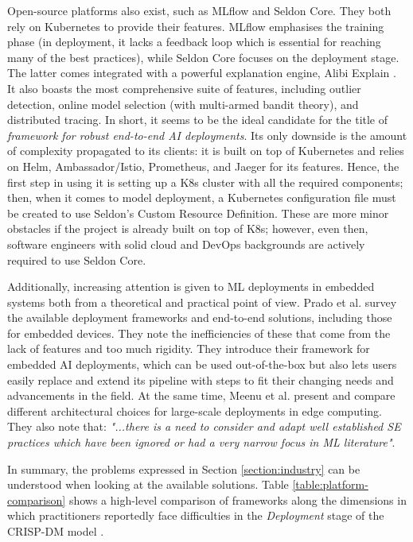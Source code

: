 Open-source platforms also exist, such as MLflow and Seldon Core. They both rely on Kubernetes to provide their features. MLflow emphasises the training phase (in deployment, it lacks a feedback loop which is essential for reaching many of the best practices), while Seldon Core focuses on the deployment stage. The latter comes integrated with a powerful explanation engine, Alibi Explain \cite{klaise2021alibi}. It also boasts the most comprehensive suite of features, including outlier detection, online model selection (with multi-armed bandit theory), and distributed tracing. In short, it seems to be the ideal candidate for the title of \textit{framework for robust end-to-end AI deployments}. Its only downside is the amount of complexity propagated to its clients: it is built on top of Kubernetes and relies on Helm, Ambassador/Istio, Prometheus, and Jaeger for its features. Hence, the first step in using it is setting up a K8s cluster with all the required components; then, when it comes to model deployment, a Kubernetes configuration file must be created to use Seldon's Custom Resource Definition. These are more minor obstacles if the project is already built on top of K8s; however, even then, software engineers with solid cloud and DevOps backgrounds are actively required to use Seldon Core.

Additionally, increasing attention is given to ML deployments in embedded systems both from a theoretical \cite{john2020ai} and practical \cite{prado2020bonseyes} point of view. Prado et al. \cite{prado2020bonseyes} survey the available deployment frameworks and end-to-end solutions, including those for embedded devices. They note the inefficiencies of these that come from the lack of features and too much rigidity. They introduce their framework for embedded AI deployments, which can be used out-of-the-box but also lets users easily replace and extend its pipeline with steps to fit their changing needs and advancements in the field. At the same time, Meenu et al. \cite{john2020ai} present and compare different architectural choices for large-scale deployments in edge computing. They also note that: \textit{"...there is a need to consider and adapt well established SE practices which have been ignored or had a very narrow focus in ML literature"}.

In summary, the problems expressed in Section \ref{section:industry} can be understood when looking at the available solutions. Table \ref{table:platform-comparison} shows a high-level comparison of frameworks along the dimensions in which practitioners reportedly face difficulties in the \textit{Deployment} stage of the CRISP-DM model \cite{wirth2000crisp}.

